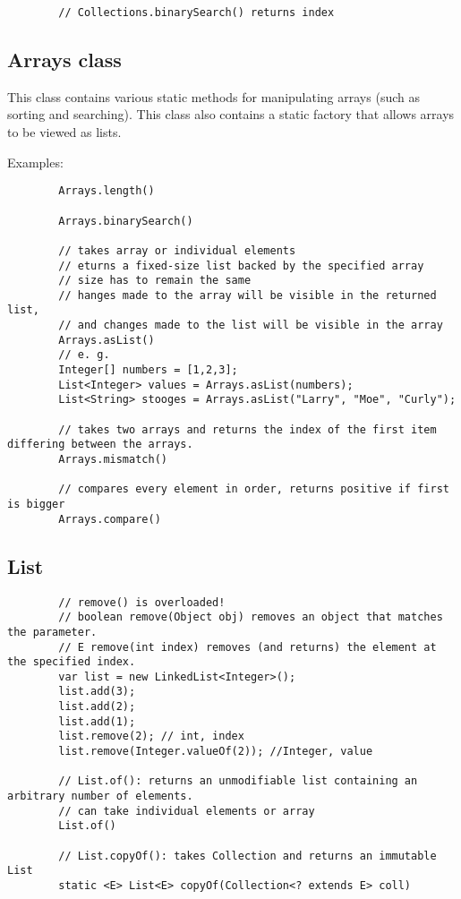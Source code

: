 \documentclass{scrartcl}
\begin{document}
    \begin{lstlisting}
        // Collections.binarySearch() returns index

    \end{lstlisting}

\subsection{Arrays class}

    This class contains various static methods for manipulating arrays (such as sorting and searching). This class also contains a static factory that allows arrays to be viewed as lists.

    Examples:

    \begin{lstlisting}
        Arrays.length()

        Arrays.binarySearch()

        // takes array or individual elements
        // eturns a fixed-size list backed by the specified array
        // size has to remain the same
        // hanges made to the array will be visible in the returned list,
        // and changes made to the list will be visible in the array
        Arrays.asList()
        // e. g.
        Integer[] numbers = [1,2,3];
        List<Integer> values = Arrays.asList(numbers);
        List<String> stooges = Arrays.asList("Larry", "Moe", "Curly");

        // takes two arrays and returns the index of the first item differing between the arrays.
        Arrays.mismatch()

        // compares every element in order, returns positive if first is bigger
        Arrays.compare()

    \end{lstlisting}


\subsection{List}

    \begin{lstlisting}
        // remove() is overloaded!
        // boolean remove(Object obj) removes an object that matches the parameter.
        // E remove(int index) removes (and returns) the element at the specified index.
        var list = new LinkedList<Integer>();
        list.add(3);
        list.add(2);
        list.add(1);
        list.remove(2); // int, index
        list.remove(Integer.valueOf(2)); //Integer, value

        // List.of(): returns an unmodifiable list containing an arbitrary number of elements.
        // can take individual elements or array
        List.of()

        // List.copyOf(): takes Collection and returns an immutable List
        static <E> List<E> copyOf(Collection<? extends E> coll)
        \end{lstlisting}
\end{document}
